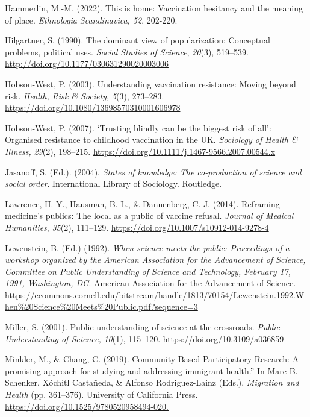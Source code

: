 \documentclass[authordate, reflection]{jote-new-article}
\begin{document}
	Hammerlin, M.-M. (2022). This is home: Vaccination hesitancy and the meaning of place. \emph{Ethnologia Scandinavica, 52}, 202-220.



	Hilgartner, S. (1990). The dominant view of popularization: Conceptual problems, political uses. \emph{Social Studies of Science}, \emph{20}(3), 519--539. \url{http://doi.org/10.1177/030631290020003006}



	Hobson-West, P. (2003). Understanding vaccination resistance: Moving beyond risk. \emph{Health, Risk \& Society,} \emph{5}(3), 273--283. \url{https://doi.org/10.1080/13698570310001606978}



	Hobson-West, P. (2007). ‘Trusting blindly can be the biggest risk of all': Organised resistance to childhood vaccination in the UK. \emph{Sociology of Health \& Illness,} \emph{29}(2), 198--215. \url{https://doi.org/10.1111/j.1467-9566.2007.00544.x}



	Jasanoff, S. (Ed.). (2004). \emph{States of knowledge: The co-production of science and social order}. International Library of Sociology. Routledge.



	Lawrence, H. Y., Hausman, B. L., \& Dannenberg, C. J. (2014). Reframing medicine's publics: The local as a public of vaccine refusal. \emph{Journal of Medical Humanities}, \emph{35}(2), 111--129. \url{https://doi.org/10.1007/s10912-014-9278-4}



	Lewenstein, B. (Ed.) (1992). \emph{When science meets the public: Proceedings of a workshop organized by the American Association for the Advancement of Science, Committee on Public Understanding of Science and Technology, February 17, 1991, Washington, DC. }American Association for the Advancement of Science. \url{https://ecommons.cornell.edu/bitstream/handle/1813/70154/Lewenstein.1992.When\%20Science\%20Meets\%20Public.pdf?sequence=3}



	Miller, S. (2001). Public understanding of science at the crossroads. \emph{Public Understanding of Science,} \emph{10}(1), 115--120. \url{https://doi.org/10.3109/a036859}



	Minkler, M., \& Chang, C. (2019). Community-Based Participatory Research: A promising approach for studying and addressing immigrant health.” In Marc B. Schenker, Xóchitl Castañeda, \& Alfonso Rodriguez-Lainz (Eds.), \emph{Migration and Health }(pp. 361--376). University of California Press. \url{https://doi.org/10.1525/9780520958494-020.}
\end{document}
